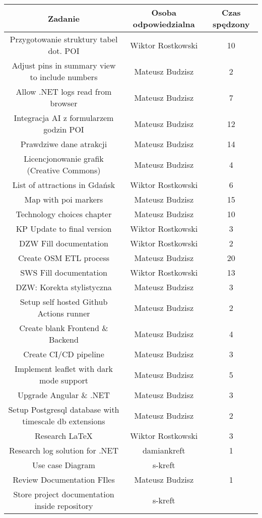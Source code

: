     \begin{table}[h!]
        \centering
        \begin{tabular}{|c|c|c|}
            \hline					
Zadanie	&	Osoba odpowiedzialna	& Czas spędzony\\
\hline
Przygotowanie struktury tabel dot. POI	&	 Wiktor Rostkowski	&	10	\\
Adjust pins in summary view to include numbers	&	Mateusz Budzisz	&	2	\\
Allow .NET logs read from browser	&	Mateusz Budzisz	&	7	\\
Integracja AI z formularzem godzin POI	&	Mateusz Budzisz	&	12	\\
Prawdziwe dane atrakcji	&	Mateusz Budzisz	&	14	\\
Licencjonowanie grafik (Creative Commons)	&	Mateusz Budzisz	&	4	\\
List of attractions in Gdańsk	&	Wiktor Rostkowski	&	6	\\
Map with poi markers	&	Mateusz Budzisz	&	15	\\
Technology choices chapter	&	Mateusz Budzisz	&	10	\\
KP Update to final version	&	Wiktor Rostkowski	&	3	\\
DZW Fill documentation	&	Wiktor Rostkowski	&	2	\\
Create OSM ETL process	&	Mateusz Budzisz	&	20	\\
SWS Fill documentation	&	Wiktor Rostkowski	&	13	\\
DZW: Korekta stylistyczna	&	Mateusz Budzisz	&	3	\\
Setup self hosted Github Actions runner	&	Mateusz Budzisz	&	2	\\
Create blank Frontend \& Backend	&	Mateusz Budzisz	&	4	\\
Create CI/CD pipeline	&	Mateusz Budzisz	&	3	\\
Implement leaflet with dark mode support	&	Mateusz Budzisz	&	5	\\
Upgrade Angular \& .NET	&	Mateusz Budzisz	&	3	\\
Setup Postgresql database with timescale db extensions	&	Mateusz Budzisz	&	2	\\
Research LaTeX	&	Wiktor Rostkowski	&	3	\\
Research log solution for .NET	&	damiankreft	&	1	\\
Use case Diagram	&	s-kreft	&		\\
Review Documentation FIles	&	Mateusz Budzisz	&	1	\\
Store project documentation inside repository	&	s-kreft	&		\\

\end{tabular}
\end{table}
